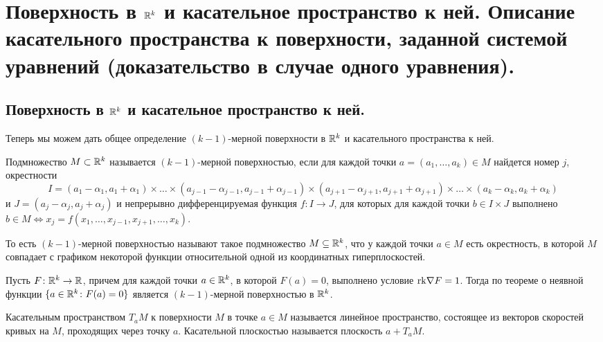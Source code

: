 \documentclass[a4paper]{article}
\theoremstyle{named}
\begin{document}
    \section{Поверхность в $\mathbb{R}^k$ и касательное пространство к ней. Описание касательного пространства к поверхности, заданной системой уравнений (доказательство в случае одного уравнения).} 
    
    \subsection{Поверхность в $\mathbb{R}^k$ и касательное пространство к ней.}

    Теперь мы можем дать общее определение $(k-1)$-мерной поверхности в $\mathbb{R}^k$ и касательного пространства к ней.
    
    \begin{definition*}
        Подмножество $M\subset \mathbb{R}^k$ называется $(k-1)$-мерной поверхностью, если для каждой точки $a=(a_1,\ldots, a_k)\in M$ найдется номер $j$, окрестности
        $$
            I = (a_1-\alpha_1, a_1+\alpha_1)\times\ldots\times (a_{j-1}-\alpha_{j-1}, a_{j-1}+\alpha_{j-1})
            \times (a_{j+1}-\alpha_{j+1}, a_{j+1}+\alpha_{j+1})	\times\ldots\times (a_k-\alpha_k, a_k+\alpha_k)
        $$
        и $J=(a_j - \alpha_j, a_j + \alpha_j)$ и непрерывно дифференцируемая функция $f \colon I \to J$, для которых для каждой точки $b\in I\times J$ выполнено $b \in M \Leftrightarrow x_j = f(x_1,\ldots, x_{j-1},x_{j+1},\ldots, x_k)$.
    \end{definition*}
    
    То есть $(k-1)$-мерной поверхностью называют такое подмножество $M \subseteq \mathbb{R}^k$, что у каждой точки $a \in M$ есть окрестность, в которой $M$ совпадает с графиком некоторой функции относительной одной из координатных гиперплоскостей.
    
    \begin{example*}
        Пусть $F\colon \mathbb{R}^k\to \mathbb{R}$, причем для каждой точки $a\in \mathbb{R}^k$, в которой $F(a)=0$, выполнено условие ${\rm rk}\nabla F=1$.
        Тогда по теореме о неявной функции $\{a\in \mathbb{R}^k\colon F(a)=0\}$ является $(k-1)$-мерной поверхностью в $\mathbb{R}^k$.
    \end{example*}
    
    \begin{definition*}
        Касательным пространством $T_aM$ к поверхности $M$ в точке $a\in M$ называется линейное пространство, состоящее из векторов скоростей
        кривых на $M$, проходящих через точку $a$. Касательной плоскостью называется плоскость $a+T_aM$.
    \end{definition*}
\end{document}
